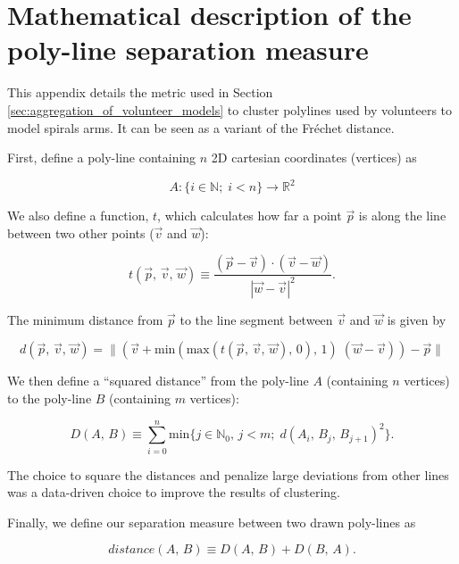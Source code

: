 \documentclass[../main.tex]{subfiles}
\begin{document}
\section{Mathematical description of the poly-line separation measure}
\label{appendix:clustering_maths}

This appendix details the metric used in Section \ref{sec:aggregation_of_volunteer_models} to cluster poly\-lines used by volunteers to model spirals arms. It can be seen as a variant of the Fréchet distance.

First, define a poly-line containing $n$ 2D cartesian coordinates (vertices) as

\begin{equation}
A: \{i \in \mathbb{N};\;i<n\} \longrightarrow \mathbb{R}
^2\end{equation}

We also define a function, $t$, which calculates how far a point $\vec{p}$ is along the line between two other points ($\vec{v}$ and $\vec{w}$):

\begin{equation}
t(\vec{p},\,\vec{v},\,\vec{w}) \equiv \frac{(\vec{p} - \vec{v})\cdot(\vec{v} - \vec{w})}{|\vec{w} - \vec{v}|^2}.
\end{equation}

The minimum distance from $\vec{p}$ to the line segment between $\vec{v}$ and $\vec{w}$ is given by

\begin{equation}
d(\vec{p},\,\vec{v},\,\vec{w}) = \|\left(\vec{v} + \mathrm{min}(\mathrm{max}(t(\vec{p},\,\vec{v},\,\vec{w}),\, 0),\, 1)\;(\vec{w} - \vec{v})\right) - \vec{p}\|
\end{equation}

We then define a ``squared distance'' from the poly-line $A$ (containing $n$ vertices) to the poly-line $B$ (containing $m$ vertices):

\begin{equation}
D(A,\,B) \equiv \sum_{i = 0}^{n} \mathrm{min}\{j \in \mathbb{N}_0,\, j < m;\; d(A_i,\, B_j,\, B_{j+1})^2\}.
\end{equation}

The choice to square the distances and penalize large deviations from other lines was a data-driven choice to improve the results of clustering.

Finally, we define our separation measure between two drawn poly-lines as

\begin{equation}
distance(A,\,B) \equiv D(A,\,B) + D(B,\,A).
\end{equation}
\end{document}
